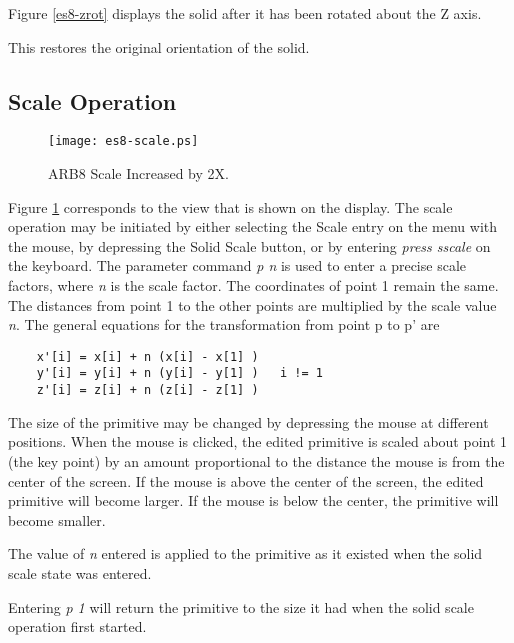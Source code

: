 Figure \ref{es8-zrot} displays the solid
after it has been rotated about the Z axis.


This restores the original orientation of the solid.

\subsection{Scale Operation}

\begin{figure}
\centering \texttt{[image: es8-scale.ps]}
\caption{ARB8 Scale Increased by 2X.}
\label{es8-scale}
\end{figure}


Figure \ref{es8-scale} corresponds to the view that is shown on the display.
The scale operation may be initiated by either selecting
the Scale entry  on the menu with the mouse,
by depressing the Solid Scale button,
or by entering {\em press sscale} on the keyboard.
The parameter command {\em p n} is
used to enter a precise scale factors, where {\em n} is
the scale factor.
The coordinates of point 1 remain the same.  The distances
from point 1 to the other points are multiplied by the scale value {\em n}.
The general equations for the transformation from point p to p' are

\begin{verbatim}
    x'[i] = x[i] + n (x[i] - x[1] )
    y'[i] = y[i] + n (y[i] - y[1] )   i != 1
    z'[i] = z[i] + n (z[i] - z[1] )
\end{verbatim}

The size of the primitive may be changed by depressing the mouse at
different positions.  When the mouse is clicked, the
edited primitive is scaled about point 1 (the key point)
by an amount proportional
to the distance the mouse is from the center of the screen.  If the mouse
is above the center of the screen, the edited primitive will become larger.
If the
mouse is below the center, the primitive will become smaller.

The value of {\em n} entered is applied to the primitive as it existed when the
solid scale state was entered.

Entering {\em p 1} will return the primitive
to the size it had when the solid scale operation first started.

